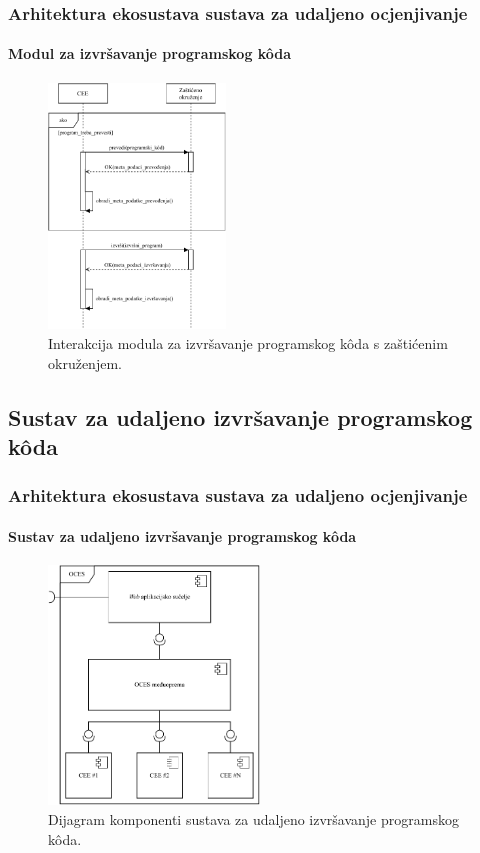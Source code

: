 \documentclass{beamer}
\newif\ifplacelogo
\begin{document}
\placelogofalse
\begin{frame}
\frametitle{Arhitektura ekosustava sustava za udaljeno ocjenjivanje}
\framesubtitle{Modul za izvršavanje programskog kôda}
\begin{figure}[htb]
	\centering
	\includegraphics[width=0.42\textwidth]{images/CEE i zasticeno okruzenje.pdf}
	\caption{
		Interakcija modula za izvršavanje programskog kôda s zaštićenim okruženjem.
	}
\end{figure}
\end{frame}
\placelogotrue

\placelogofalse
\subsection{Sustav za udaljeno izvršavanje programskog kôda}
\begin{frame}
\frametitle{Arhitektura ekosustava sustava za udaljeno ocjenjivanje}
\framesubtitle{Sustav za udaljeno izvršavanje programskog kôda}
\begin{figure}[htb]
	\centering
	\includegraphics[width=0.5\textwidth]{images/Arhitektura OCES-a.pdf}
	\caption{
		Dijagram komponenti sustava za udaljeno izvršavanje programskog kôda.
	}
\end{figure}
\end{frame}
\placelogotrue
\end{document}
